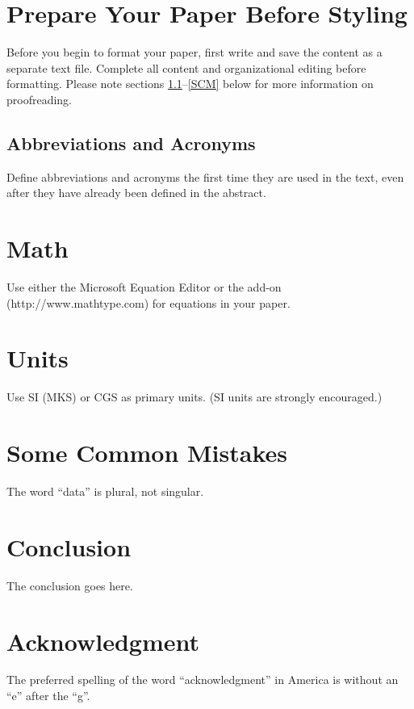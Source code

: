 \documentclass[conference]{IEEEtran}
\begin{document}
\section{Prepare Your Paper Before Styling}
Before you begin to format your paper, first write and save the content as a
separate text file. Complete all content and organizational editing before
formatting. Please note sections \ref{AA}--\ref{SCM} below for more information on proofreading.

\subsection{Abbreviations and Acronyms}\label{AA}
Define abbreviations and acronyms the first time they are used in the text,
even after they have already been defined in the abstract.

\section{Math}
Use either the Microsoft Equation Editor or the \MathType add-on
(http://www.mathtype.com) for equations in your paper.

\section{Units}
Use SI (MKS) or CGS as primary units. (SI units are strongly encouraged.)

\section{Some Common Mistakes}
The word ``data'' is plural, not singular.

\section{Conclusion}
The conclusion goes here.

\section*{Acknowledgment}
The preferred spelling of the word ``acknowledgment'' in America is without an ``e'' after the ``g''.



\end{document}
